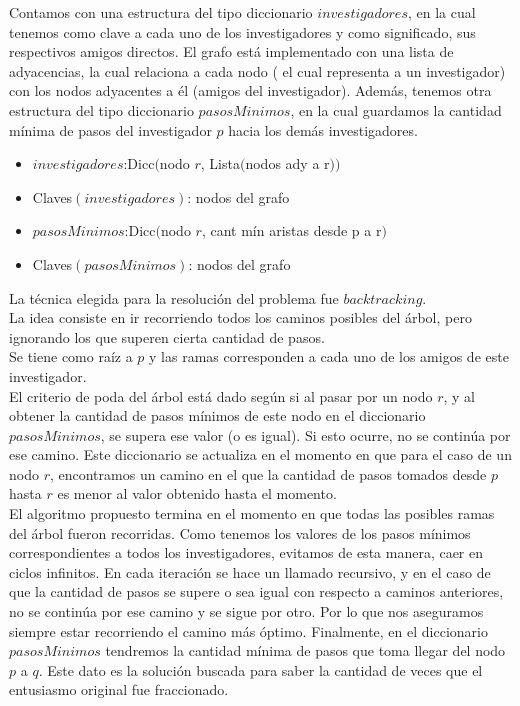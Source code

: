 \documentclass[12pt, a4paper,english,spanish]{article}
\begin{document}
Contamos con una estructura del tipo diccionario $investigadores$, en la cual tenemos como clave a cada uno de los investigadores y como significado, sus respectivos amigos directos. 
El grafo est\'a implementado con una lista de adyacencias, la cual relaciona a cada nodo ( el cual representa a un investigador) con los nodos adyacentes a \'el (amigos del investigador). 
Adem\'as, tenemos otra estructura del tipo diccionario $pasosMinimos$, en la cual guardamos la cantidad m\'inima de pasos del investigador $p$ hacia los dem\'as investigadores. 
\\
\begin{itemize}
\item $investigadores$:Dicc$($nodo $r$, Lista$($nodos ady a r$))$
\item Claves$(investigadores)$: nodos del grafo 
\item $pasosMinimos$:Dicc$($nodo $r$, cant m\'in aristas desde p a r$)$
\item Claves$(pasosMinimos)$: nodos del grafo 
\end{itemize}
La t\'ecnica elegida para la resoluci\'on del problema fue $backtracking$. \\ 
La idea consiste en ir recorriendo todos los caminos posibles del \'arbol, pero ignorando los que superen cierta cantidad de pasos. \\
Se tiene como ra\'iz a $p$ y las ramas corresponden a cada uno de los amigos de este investigador. \\
El criterio de poda del \'arbol est\'a dado seg\'un si al pasar por un nodo $r$, y al obtener la cantidad de pasos m\'inimos de este nodo en el diccionario $pasosMinimos$, se supera ese valor (o es igual). Si esto ocurre, no se contin\'ua por ese camino. Este diccionario se actualiza en el momento en que para el caso de un nodo $r$, encontramos un camino en el que la cantidad de pasos tomados desde $p$ hasta $r$ es menor al valor obtenido hasta el momento. 
\\

El algoritmo propuesto termina en el momento en que todas las posibles ramas del \'arbol fueron recorridas. 
Como tenemos los valores de los pasos m\'inimos correspondientes a todos los investigadores, evitamos de esta manera, caer en ciclos infinitos. 
En cada iteraci\'on se hace un llamado recursivo, y en el caso de que la cantidad de pasos se supere o sea igual con respecto a caminos anteriores, no se contin\'ua por ese camino y se sigue por otro. Por lo que nos aseguramos siempre estar recorriendo el camino m\'as \'optimo. Finalmente, en el diccionario $pasosMinimos$ tendremos la cantidad m\'inima de pasos que toma llegar del nodo $p$ a $q$. Este dato es la soluci\'on buscada para saber la cantidad de veces que el entusiasmo original fue fraccionado. 
\\
\end{document}
